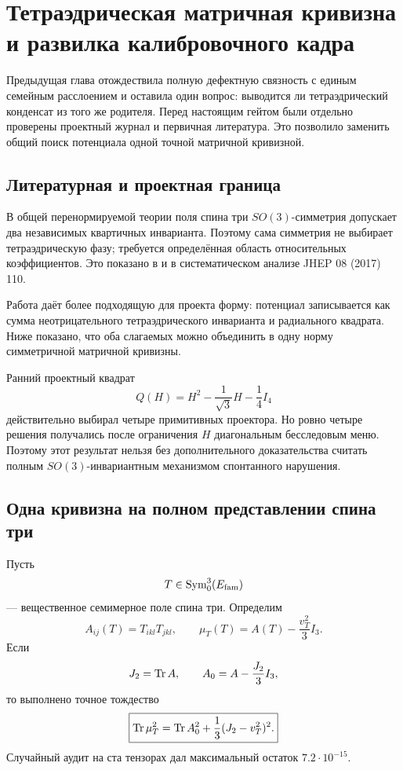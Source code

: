 \chapter{Тетраэдрическая матричная кривизна и развилка калибровочного кадра}

Предыдущая глава отождествила полную дефектную связность с единым
семейным расслоением и оставила один вопрос: выводится ли тетраэдрический
конденсат из того же родителя. Перед настоящим гейтом были отдельно
проверены проектный журнал и первичная литература. Это позволило заменить
общий поиск потенциала одной точной матричной кривизной.

\section{Литературная и проектная граница}

В общей перенормируемой теории поля спина три $SO(3)$-симметрия допускает
два независимых квартичных инварианта. Поэтому сама симметрия не выбирает
тетраэдрическую фазу; требуется определённая область относительных
коэффициентов. Это показано в  и в систематическом
анализе JHEP 08 (2017) 110.

Работа  даёт более подходящую для проекта форму:
потенциал записывается как сумма неотрицательного тетраэдрического
инварианта и радиального квадрата. Ниже показано, что оба слагаемых можно
объединить в одну норму симметричной матричной кривизны.

Ранний проектный квадрат
\begin{equation}
 Q(H)=H^2-\frac1{\sqrt3}H-\frac14I_4
\end{equation}
действительно выбирал четыре примитивных проектора. Но ровно четыре
решения получались после ограничения $H$ диагональным бесследовым меню.
Поэтому этот результат нельзя без дополнительного доказательства считать
полным $SO(3)$-инвариантным механизмом спонтанного нарушения.

\section{Одна кривизна на полном представлении спина три}

Пусть
\begin{equation}
 T\in\operatorname{Sym}^3_0(E_{\rm fam})
\end{equation}
--- вещественное семимерное поле спина три. Определим
\begin{equation}
 A_{ij}(T)=T_{ikl}T_{jkl},
 \qquad
 \mu_T(T)=A(T)-\frac{v_T^2}{3}I_3.
 \label{eq:v6-tetrahedral-matrix-curvature}
\end{equation}
Если
\begin{equation}
 J_2=\operatorname{Tr} A,
 \qquad
 A_0=A-\frac{J_2}{3}I_3,
\end{equation}
то выполнено точное тождество
\begin{equation}
 \boxed{
 \operatorname{Tr}\mu_T^2
 =\operatorname{Tr} A_0^2+\frac13(J_2-v_T^2)^2.}
 \label{eq:v6-tetrahedral-curvature-decomposition}
\end{equation}
Случайный аудит на ста тензорах дал максимальный остаток
$7.2\cdot10^{-15}$.


